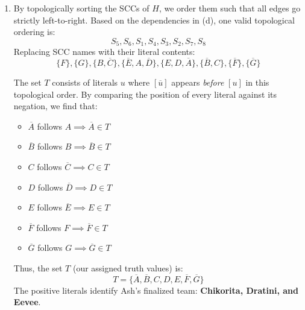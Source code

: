\documentclass[11pt]{article}
\begin{document}
\begin{enumerate}[label=\textbf{(\alph*)}]
    \item By topologically sorting the SCCs of $H$, we order them such that all edges go strictly left-to-right. Based on the dependencies in (d), one valid topological ordering is: 
    $$S_5, S_6, S_1, S_4, S_3, S_2, S_7, S_8$$
    Replacing SCC names with their literal contents:
    $$\{F\}, \{G\}, \{B, \overline{C}\}, \{\overline{E}, A, \overline{D}\}, \{E, D, \overline{A}\}, \{\overline{B}, C\}, \{\overline{F}\}, \{\overline{G}\}$$
    
    The set $T$ consists of literals $u$ where $[\overline{u}]$ appears \textit{before} $[u]$ in this topological order. 
    By comparing the position of every literal against its negation, we find that:
    \begin{itemize}
        \item $\overline{A}$ follows $A \implies \overline{A} \in T$
        \item $\overline{B}$ follows $B \implies \overline{B} \in T$
        \item $C$ follows $\overline{C} \implies C \in T$
        \item $D$ follows $\overline{D} \implies D \in T$
        \item $E$ follows $\overline{E} \implies E \in T$
        \item $\overline{F}$ follows $F \implies \overline{F} \in T$
        \item $\overline{G}$ follows $G \implies \overline{G} \in T$
    \end{itemize}
    Thus, the set $T$ (our assigned truth values) is:
    $$T = \{\overline{A}, \overline{B}, C, D, E, \overline{F}, \overline{G}\}$$
    The positive literals identify Ash's finalized team: \textbf{Chikorita, Dratini, and Eevee}.
\end{enumerate}
\end{document}

